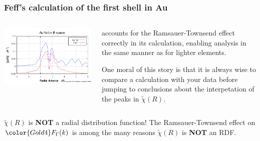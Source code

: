 \documentclass[10pt, xcolor=x11names, compress]{beamer}
\begin{document}
\begin{frame}
  \frametitle{Feff's calculation of the first shell in Au}
  \begin{columns}
    \begin{column}{0.5\linewidth}
      \includegraphics[width=\linewidth]{Au+path.png}
    \end{column}
    \begin{column}{0.5\linewidth}
      {\feff} accounts for the Ramsauer-Townsend effect correctly in
      its calculation, enabling analysis in the same manner as for
      lighter elements.

      \bigskip

      One moral of this story is that it is always wise to compare a
      {\feff} calculation with your data before jumping to conclusions
      about the interpetation of the peaks in $\tilde\chi(R)$.
    \end{column}
  \end{columns}

  \bigskip

  \begin{alertblock}{$\tilde\chi(R)$ is \textbf{NOT} a radial distribution function!}
    The Ramsauer-Townsend effect on ${\color{Gold4}F_\Gamma(k)}$ is
    among the many reasons $\tilde\chi(R)$ is \textbf{NOT} an RDF.
  \end{alertblock}
\end{frame}
\end{document}

